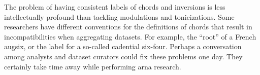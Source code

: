 
The problem of having consistent labels of chords and
inversions is less intellectually profound than tackling
modulations and tonicizations. Some researchers have
different conventions for the definitions of chords that
result in incompatibilities when aggregating datasets. For
example, the ``root'' of a French \gls{augsix}, or the label
for a so-called cadential six-four. Perhaps a conversation
among analysts and dataset curators could fix these problems
one day. They certainly take time away while performing
\gls{arna} research.

